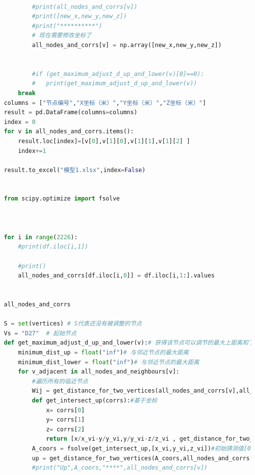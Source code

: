 \documentclass[withoutpreface,bwprint]{cumcmthesis} %
\begin{document}
\begin{appendices}
\begin{lstlisting}[language=python]
        
        #print(all_nodes_and_corrs[v])
        #print([new_x,new_y,new_z])
        #print("**********")
        # 现在需要修改坐标了
        all_nodes_and_corrs[v] = np.array([new_x,new_y,new_z])
        
        
        #if (get_maximum_adjust_d_up_and_lower(v)[0]==0):
        #   print(get_maximum_adjust_d_up_and_lower(v))
    break
columns = ["节点编号","X坐标（米）","Y坐标（米）","Z坐标（米）"]
result = pd.DataFrame(columns=columns)
index = 0
for v in all_nodes_and_corrs.items():
    result.loc[index]=[v[0],v[1][0],v[1][1],v[1][2] ]  
    index+=1

result.to_excel("模型1.xlsx",index=False)


from scipy.optimize import fsolve



for i in range(2226):
    #print(df.iloc[i,1])

    #print()
    all_nodes_and_corrs[df.iloc[i,0]] = df.iloc[i,1:].values

    
all_nodes_and_corrs    

S = set(vertices) # S代表还没有被调整的节点
Vs = "D27"  # 起始节点
def get_maximum_adjust_d_up_and_lower(v):# 获得该节点可以调节的最大上距离和下距离
    minimum_dist_up = float("inf")# 与邻近节点的最大距离
    minimum_dist_lower = float("inf")# 与邻近节点的最大距离
    for v_adjacent in all_nodes_and_neighbours[v]:
        #遍历所有的临近节点
        Wij = get_distance_for_two_vertices(all_nodes_and_corrs[v],all_nodes_and_corrs[v_adjacent])
        def get_intersect_up(corrs):#基于坐标
            x= corrs[0]
            y= corrs[1]
            z= corrs[2]
            return [x/x_vi-y/y_vi,y/y_vi-z/z_vi , get_distance_for_two_vertices([x,y,z],all_nodes_and_corrs[v_adjacent])-Wij*(1-0.0007)]
        A_coors = fsolve(get_intersect_up,[x_vi,y_vi,z_vi])#初始猜测值[0,-1]
        up = get_distance_for_two_vertices(A_coors,all_nodes_and_corrs[v])
        #print("Up",A_coors,"****",all_nodes_and_corrs[v])
        

\end{lstlisting}
\end{appendices}
\end{document}
